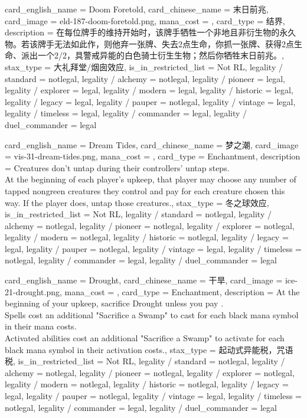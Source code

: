 \documentclass[lang = cn, color = black, 10pt]{AllThatStax}
\begin{document}
\card
{
	card_english_name = {Doom Foretold},
	card_chinese_name = {末日前兆},
	card_image = eld-187-doom-foretold.png,
	mana_cost = ,
	card_type = 结界,
	description = {在每位牌手的维持开始时，该牌手牺牲一个非地且非衍生物的永久物。若该牌手无法如此作，则他弃一张牌、失去2点生命，你抓一张牌、获得2点生命、派出一个2/2，具警戒异能的白色骑士衍生生物；然后你牺牲末日前兆。},
	stax_type = 大礼拜堂/烟囱效应,
	is_in_restricted_list = Not RL,
	legality / standard = notlegal,
	legality / alchemy = notlegal,
	legality / pioneer = legal,
	legality / explorer = legal,
	legality / modern = legal,
	legality / historic = legal,
	legality / legacy = legal,
	legality / pauper = notlegal,
	legality / vintage = legal,
	legality / timeless = legal,
	legality / commander = legal,
	legality / duel_commander = legal
}

\card
{
	card_english_name = {Dream Tides},
	card_chinese_name = {梦之潮},
	card_image = vis-31-dream-tides.png,
	mana_cost = ,
	card_type = Enchantment,
	description = {Creatures don't untap during their controllers' untap steps.\\
		At the beginning of each player's upkeep, that player may choose any number of tapped nongreen creatures they control and pay  for each creature chosen this way. If the player does, untap those creatures.},
	stax_type = 冬之球效应,
	is_in_restricted_list = Not RL,
	legality / standard = notlegal,
	legality / alchemy = notlegal,
	legality / pioneer = notlegal,
	legality / explorer = notlegal,
	legality / modern = notlegal,
	legality / historic = notlegal,
	legality / legacy = legal,
	legality / pauper = notlegal,
	legality / vintage = legal,
	legality / timeless = notlegal,
	legality / commander = legal,
	legality / duel_commander = legal
}

\card
{
	card_english_name = {Drought},
	card_chinese_name = {干旱},
	card_image = ice-21-drought.png,
	mana_cost = ,
	card_type = Enchantment,
	description = {At the beginning of your upkeep, sacrifice Drought unless you pay .\\
		Spells cost an additional "Sacrifice a Swamp" to cast for each black mana symbol in their mana costs.\\
		Activated abilities cost an additional "Sacrifice a Swamp" to activate for each black mana symbol in their activation costs.},
	stax_type = 起动式异能税，咒语税,
	is_in_restricted_list = Not RL,
	legality / standard = notlegal,
	legality / alchemy = notlegal,
	legality / pioneer = notlegal,
	legality / explorer = notlegal,
	legality / modern = notlegal,
	legality / historic = notlegal,
	legality / legacy = legal,
	legality / pauper = notlegal,
	legality / vintage = legal,
	legality / timeless = notlegal,
	legality / commander = legal,
	legality / duel_commander = legal
}
\end{document}
